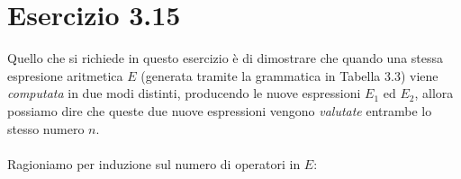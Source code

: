 \section*{Esercizio 3.15}

    
    Quello che si richiede in questo esercizio è di dimostrare che quando una stessa espresione aritmetica $E$ (generata tramite la grammatica in Tabella 3.3) viene \textit{computata} in due modi distinti, producendo le nuove espressioni $E_1$ ed $E_2$, allora possiamo dire che queste due nuove espressioni vengono \textit{valutate} entrambe lo stesso numero $n$.\\
    \\
    Ragioniamo per induzione sul numero di operatori in $E$:

